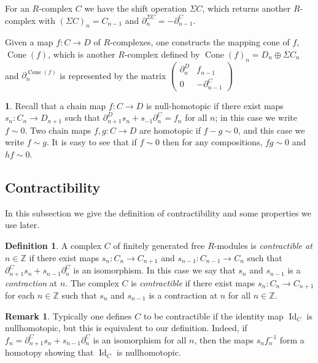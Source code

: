 \documentclass{amsart}[11pt]
\newcommand{\Cone}{\operatorname{Cone}}
\newcommand{\Id}{\operatorname{Id}\nolimits}
\numberwithin{equation}{section}
\theoremstyle{plain}
\newtheorem*{Main Theorem}{Main Theorem}
\theoremstyle{definition}
\newtheorem{chunk}[theorem]{}
\newtheorem{remark}[theorem]{Remark}
\newtheorem{definition}[theorem]{Definition}
\theoremstyle{remark}
\numberwithin{equation}{theorem}
\begin{document}
For an $R$-complex $C$ we have the shift operation $\Sigma C$, which returns another $R$-complex with
$(\Sigma C)_n=C_{n-1}$ and $\partial_n^{\Sigma C}=-\partial_{n-1}^C$. 

Given a map $f:C\to D$ of $R$-complexes, one constructs the mapping cone of $f$, $\Cone(f)$, which is another
$R$-complex defined by $\Cone(f)_n=D_n\oplus \Sigma C_n$ and 
$\partial_n^{\Cone(f)}$ is represented by the matrix 
$\left(\begin{array}{cc} \partial_n^D & f_{n-1}\\ 0 & -\partial_{n-1}^C \end{array}\right)$

\begin{chunk}\label{compose null}
Recall that a chain map $f:C\to D$ is null-homotopic if there exist maps $s_n:C_n\to D_{n+1}$ such that $\partial_{n+1}^Ds_n+s_{-1}\partial_n^C=f_n$ for all $n$; in this case we write $f\sim 0$. Two chain maps $f,g:C\to D$ are homotopic if $f-g\sim 0$, and this case we write $f\sim g$. It is easy to see that if $f\sim 0$ then for any compositions, $fg\sim 0$ and $hf\sim 0$. 
\end{chunk}

\subsection*{Contractibility} In this subsection we give the definition of contractibility and some properties we use later.

\begin{definition} A complex $C$ of finitely generated free $R$-modules is \emph{contractible at $n\in\mathbb Z$} if there exist maps $s_n:C_n\to C_{n+1}$ and $s_{n-1}:C_{n-1}\to C_n$ such that 
$\partial^C_{n+1}s_n+s_{n-1}\partial^C_n$ is an isomorphism.  In this case we say that $s_n$ and $s_{n-1}$ is a \emph{contraction} at $n$. The complex $C$ is \emph{contractible} if there exist maps 
$s_n:C_n\to C_{n+1}$ for each $n\in\mathbb Z$ such that $s_n$ and $s_{n-1}$ is a contraction at $n$ for all 
$n\in\mathbb Z$.
\end{definition}

\begin{remark} Typically one defines $C$ to be contractible if the identity map $\Id_C$ is 
nullhomotopic, but this is equivalent to our definition. Indeed, if 
$f_n=\partial^C_{n+1}s_n+s_{n-1}\partial^C_n$ is an isomorphism for all $n$, then the maps 
$s_nf_n^{-1}$ form a homotopy showing that $\Id_C$ is nullhomotopic.
\end{remark}
\end{document}

